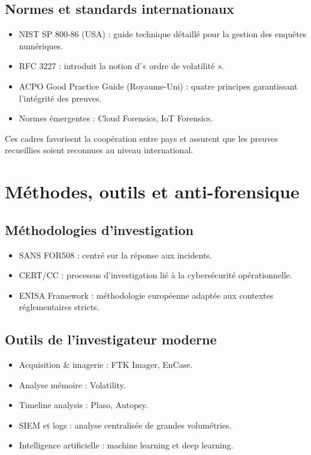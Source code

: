 \documentclass[12pt,a4paper]{article}
\begin{document}
\subsection{Normes et standards internationaux}

\begin{itemize}
    \item NIST SP 800-86 (USA) : guide technique détaillé pour la gestion des enquêtes numériques.
    \item RFC 3227 : introduit la notion d’« ordre de volatilité ».
    \item ACPO Good Practice Guide (Royaume-Uni) : quatre principes garantissant l’intégrité des preuves.
    \item Normes émergentes : Cloud Forensics, IoT Forensics.
\end{itemize}

Ces cadres favorisent la coopération entre pays et assurent que les preuves recueillies soient reconnues au niveau international.

\section{Méthodes, outils et anti-forensique}

\subsection{Méthodologies d’investigation}

\begin{itemize}
    \item SANS FOR508 : centré sur la réponse aux incidents.
    \item CERT/CC : processus d’investigation lié à la cybersécurité opérationnelle.
    \item ENISA Framework : méthodologie européenne adaptée aux contextes réglementaires stricts.
\end{itemize}

\subsection{Outils de l’investigateur moderne}

\begin{itemize}
    \item Acquisition \& imagerie : FTK Imager, EnCase.
    \item Analyse mémoire : Volatility.
    \item Timeline analysis : Plaso, Autopsy.
    \item SIEM et logs : analyse centralisée de grandes volumétries.
    \item Intelligence artificielle : machine learning et deep learning.
\end{itemize}
\end{document}
